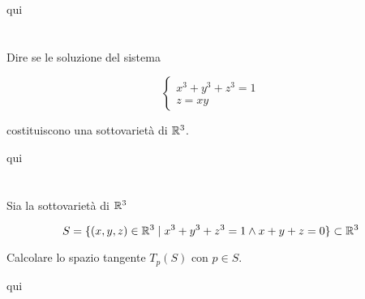 qui

%

\newpage

%

\section{}\label{es2-14}

\begin{tcolorbox}
	Dire se le soluzione del sistema
	
	\begin{equation}
		\begin{cases}
			x^{3} + y^{3} + z^{3} = 1\\
			z = xy
		\end{cases}
	\end{equation}

	costituiscono una sottovarietà di $ \mathbb{R}^{3} $.
\end{tcolorbox}

qui

%

\newpage

%

\section{}\label{BONUS2-3}

\begin{tcolorbox}
	Sia la sottovarietà di $ \mathbb{R}^{3} $
	
	\begin{equation}
		S = \{ (x,y,z) \in \mathbb{R}^{3} \mid x^{3} + y^{3} + z^{3} = 1 \wedge x+y+z=0 \} \subset \mathbb{R}^{3}
	\end{equation}
	
	Calcolare lo spazio tangente $ T_{p}(S) $ con $ p \in S $.
\end{tcolorbox}

qui

%

\newpage

%

\section{}\label{es2-15}

